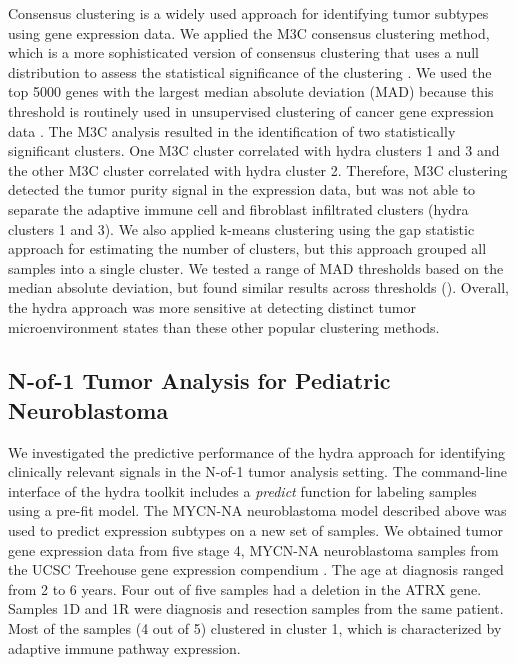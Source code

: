 \documentclass[10pt,letterpaper]{article}
\begin{document}
Consensus clustering is a widely used approach for identifying tumor subtypes using gene expression data. We applied the M3C consensus clustering method, which is a more sophisticated version of consensus clustering that uses a null distribution to assess the statistical significance of the clustering \cite{johnM3CMonteCarlo2018, wilkersonConsensusClusterPlusClassDiscovery2010a}. We used the top 5000 genes with the largest median absolute deviation (MAD) because this threshold is routinely used in unsupervised clustering of cancer gene expression data \cite{bourgonIndependentFilteringIncreases2010, tritchlerFilteringGenesCluster2009, carcamo-oriveAnalysisTranscriptionalVariability2017}. The M3C analysis resulted in the identification of two statistically significant clusters. One M3C cluster correlated with hydra clusters 1 and 3 and the other M3C cluster correlated with hydra cluster 2. Therefore, M3C clustering detected the tumor purity signal in the expression data, but was not able to separate the adaptive immune cell and fibroblast infiltrated clusters (hydra clusters 1 and 3). We also applied k-means clustering using the gap statistic approach \cite{tibshirani2001estimating,maechler2012cluster} for estimating the number of clusters, but this approach grouped all samples into a single cluster. We tested a range of MAD thresholds based on the median absolute deviation, but found similar results across thresholds (). Overall, the hydra approach was more sensitive at detecting distinct tumor microenvironment states than these other popular clustering methods.

\subsection*{N-of-1 Tumor Analysis for Pediatric Neuroblastoma}
We investigated the predictive performance of the hydra approach for identifying clinically relevant signals in the N-of-1 tumor analysis setting. The command-line interface of the hydra toolkit includes a \textit{predict} function for labeling samples using a pre-fit model. The MYCN-NA neuroblastoma model described above was used to predict expression subtypes on a new set of samples. We obtained tumor gene expression data from five stage 4, MYCN-NA neuroblastoma samples from the UCSC Treehouse gene expression compendium \cite{newtonTumorMapExploringMolecular2017, vaskeComparativeTumorRNA2019}. The age at diagnosis ranged from 2 to 6 years. Four out of five samples had a deletion in the ATRX gene. Samples 1D and 1R were diagnosis and resection samples from the same patient. Most of the samples (4 out of 5) clustered in cluster 1, which is characterized by adaptive immune pathway expression.
\end{document}
